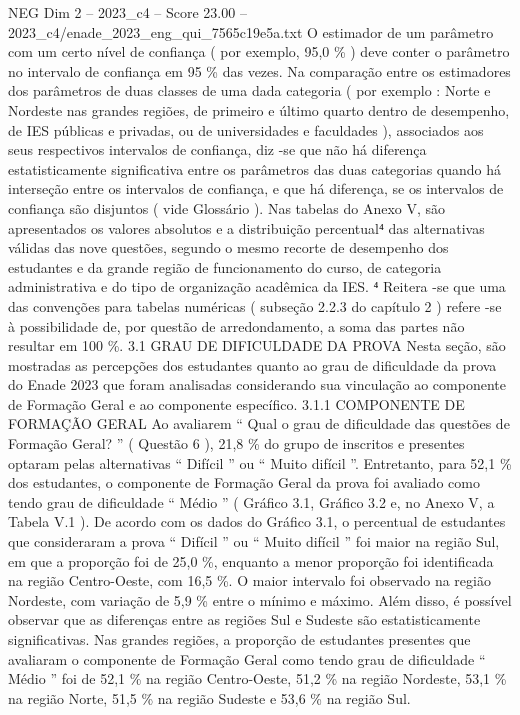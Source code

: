 \begin{textsample}{NEG Dim 2 – 2023\_c4 – Score 23.00 – 2023\_c4/enade\_2023\_eng\_qui\_7565c19e5a.txt}
O estimador de um parâmetro com um certo nível de confiança ( por exemplo, 95,0 \% ) deve conter o parâmetro no intervalo de confiança em 95 \% das vezes.
Na comparação entre os estimadores dos parâmetros de duas classes de uma dada categoria ( por exemplo : Norte e Nordeste nas grandes regiões, de primeiro e último quarto dentro de desempenho, de IES públicas e privadas, ou de universidades e faculdades ), associados aos seus respectivos intervalos de confiança, diz -se que não há diferença estatisticamente significativa entre os parâmetros das duas categorias quando há interseção entre os intervalos de confiança, e que há diferença, se os intervalos de confiança são disjuntos ( vide Glossário ).
Nas tabelas do Anexo V, são apresentados os valores absolutos e a distribuição percentual⁴ das alternativas válidas das nove questões, segundo o mesmo recorte de desempenho dos estudantes e da grande região de funcionamento do curso, de categoria administrativa e do tipo de organização acadêmica da IES. ⁴ Reitera -se que uma das convenções para tabelas numéricas ( subseção 2.2.3 do capítulo 2 ) refere -se à possibilidade de, por questão de arredondamento, a soma das partes não resultar em 100 \%. 3.1 GRAU DE DIFICULDADE DA PROVA Nesta seção, são mostradas as percepções dos estudantes quanto ao grau de dificuldade da prova do Enade 2023 que foram analisadas considerando sua vinculação ao componente de Formação Geral e ao componente específico. 3.1.1 COMPONENTE DE FORMAÇÃO GERAL Ao avaliarem “ Qual o grau de dificuldade das questões de Formação Geral? ” ( Questão 6 ), 21,8 \% do grupo de inscritos e presentes optaram pelas alternativas “ Difícil ” ou “ Muito difícil ”.
Entretanto, para 52,1 \% dos estudantes, o componente de Formação Geral da prova foi avaliado como tendo grau de dificuldade “ Médio ” ( Gráfico 3.1, Gráfico 3.2 e, no Anexo V, a Tabela V.1 ).
De acordo com os dados do Gráfico 3.1, o percentual de estudantes que consideraram a prova “ Difícil ” ou “ Muito difícil ” foi maior na região Sul, em que a proporção foi de 25,0 \%, enquanto a menor proporção foi identificada na região Centro-Oeste, com 16,5 \%.
O maior intervalo foi observado na região Nordeste, com variação de 5,9 \% entre o mínimo e máximo.
Além disso, é possível observar que as diferenças entre as regiões Sul e Sudeste são estatisticamente significativas.
Nas grandes regiões, a proporção de estudantes presentes que avaliaram o componente de Formação Geral como tendo grau de dificuldade “ Médio ” foi de 52,1 \% na região Centro-Oeste, 51,2 \% na região Nordeste, 53,1 \% na região Norte, 51,5 \% na região Sudeste e 53,6 \% na região Sul.

\end{textsample}

